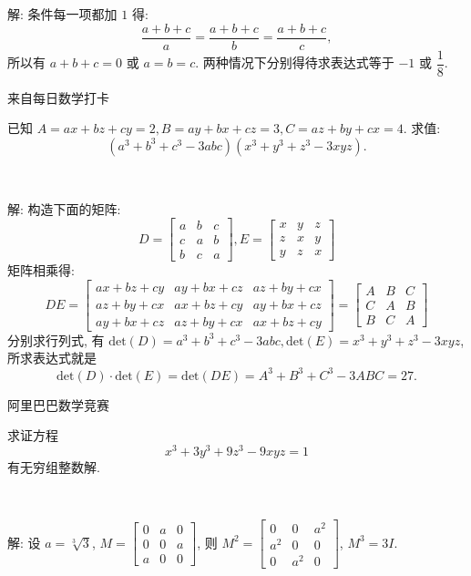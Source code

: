 解: 条件每一项都加 $1$ 得:
$$ \frac{a+b+c}{a}=\frac{a+b+c}{b}=\frac{a+b+c}{c} ,$$ 
所以有 $a+b+c=0$ 或 $a=b=c$. 
两种情况下分别得待求表达式等于 $-1$ 或 $\dfrac{1}{8}$.


\newpage
\noindent 来自每日数学打卡

已知 $A = ax + bz + cy = 2, B = ay + bx + cz = 3, C = az + by + cx = 4$. 求值:
\[(a^3+b^3+c^3-3abc)(x^3+y^3+z^3-3xyz) .\]

~

解: 构造下面的矩阵:
\[
D = \begin{bmatrix}
a & b & c \\
c & a & b \\
b & c & a
\end{bmatrix}, 
E = \begin{bmatrix}
x & y & z \\
z & x & y \\
y & z & x
\end{bmatrix}
\]
矩阵相乘得:
\[
DE = \begin{bmatrix}
ax+bz+cy & ay+bx+cz & az+by+cx \\
az+by+cx & ax+bz+cy & ay+bx+cz \\
ay+bx+cz & az+by+cx & ax+bz+cy 
\end{bmatrix} = 
\begin{bmatrix}
A & B & C\\
C & A & B\\
B & C & A 
\end{bmatrix}
\]
分别求行列式, 有 $\mathrm{det}(D) = a^3 + b^3 + c^3 - 3abc, \mathrm{det}(E) = x^3+y^3+z^3-3xyz$, 所求表达式就是 
\[ \mathrm{det}(D)\cdot\mathrm{det}(E) = \mathrm{det}(DE) = A^3+B^3+C^3-3ABC = 27 . \]

\newpage
\noindent 阿里巴巴数学竞赛

求证方程
\[x^3+3y^3+9z^3-9xyz=1 \]
有无穷组整数解.

~

解: 设 $a = \sqrt[3]{3}$, $M = \begin{bmatrix}
0 & a & 0 \\
0 & 0 & a \\
a & 0 & 0
\end{bmatrix}$, 则 $M^2 = \begin{bmatrix}
0 & 0 & a^2 \\
a^2 & 0 & 0 \\
0 & a^2 & 0
\end{bmatrix}$, $M^3=3I$.

